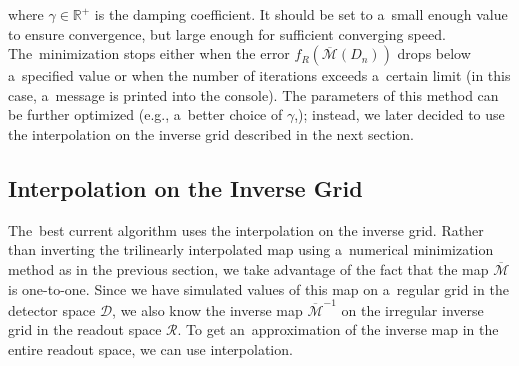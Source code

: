 			where $\gamma\in\mathbb{R}^+$ is the damping coefficient. It should be set to a~small enough value to ensure convergence, but large enough for sufficient converging speed. The~minimization stops either when the error $f_R(\overline{\mathcal{M}}(D_n))$ drops below a~specified value or when the number of iterations exceeds a~certain limit (in this case, a~message is printed into the console).
			The parameters of this method can be further optimized (e.g., a~better choice of $\gamma$,); instead, we later decided to use the interpolation on the inverse grid described in the next section.
			
		
		\subsection{Interpolation on the Inverse Grid}
		\label{sec:interpol}			
			
			The~best current algorithm uses the interpolation on the inverse grid. Rather than inverting the trilinearly interpolated map using a~numerical minimization method as in the previous section, we take advantage of the fact that the map $\overline{\mathcal{M}}$ is one-to-one. Since we have simulated values of this map on a~regular grid in the detector space $\mathcal{D}$, we also know the inverse map $\overline{\mathcal{M}}^{-1}$ on the irregular inverse grid in the readout space $\mathcal{R}$. To get an~approximation of the inverse map in the entire readout space, we can use interpolation.
			
